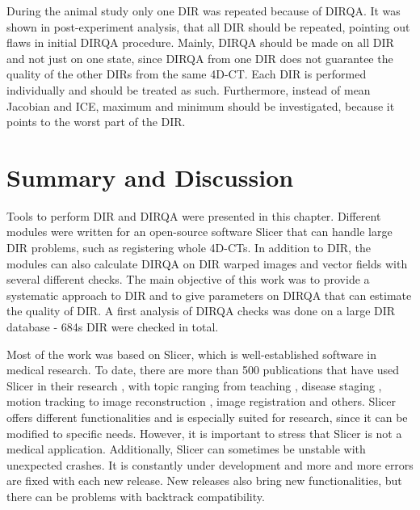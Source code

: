 During the animal study only one DIR was repeated because of DIRQA. It was shown in post-experiment analysis, that all DIR should be repeated, pointing out flaws in initial DIRQA procedure.
Mainly, DIRQA should be made on all DIR and not just on one state, since DIRQA from one DIR does not guarantee the quality of the other DIRs from the same 4D-CT. 
Each DIR is performed individually and should be treated as such. Furthermore, instead of mean Jacobian and ICE, maximum and minimum should be investigated, 
because it points to the worst part of the DIR.





\section{Summary and Discussion}
\label{Summary}

Tools to perform DIR and DIRQA were presented in this chapter. Different modules were written for an open-source software Slicer that can handle large DIR problems, such as registering whole 4D-CTs. 
In addition to DIR, the modules can also calculate DIRQA on DIR warped images and vector fields with several different checks.
The main objective of this work was to provide a systematic approach to DIR and to give parameters on DIRQA that can estimate the quality of DIR. A first analysis of DIRQA checks was done on a large DIR database - 684s DIR were checked in total.

Most of the work was based on Slicer, which is well-established software in medical research. To date, there are more than 500 publications that have used Slicer in their research \cite{SlicerCitation}, with topic ranging from 
teaching \cite{Pujol2016}, disease staging \cite{Liu2015, Liu2016b}, motion tracking \cite{Behringer2015} to image reconstruction \cite{Meyer2015}, image registration \cite{Li2015, Fedorov2015, Li2015b}
and others. Slicer offers different functionalities and is especially suited for research, since it can be modified to specific needs. However, it is important to stress that Slicer 
is not a medical application. Additionally, Slicer can sometimes be unstable with unexpected crashes. It is constantly under development and more and more errors
are fixed with each new release. New releases also bring new functionalities, but there can be problems with backtrack compatibility. 

